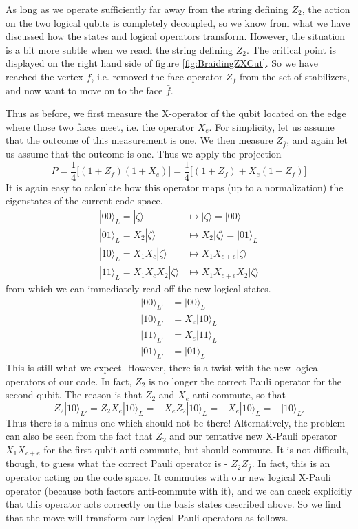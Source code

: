 \documentclass[a4paper, draft]{article}
\theoremstyle{own}
\theoremstyle{remark}
\begin{document}
As long as we operate sufficiently far away from the string defining $Z_2$, the action on the two logical qubits is completely decoupled, so we know from what we have discussed how the states and logical operators transform. However, the situation is a bit more subtle when we reach the string defining $Z_2$. The critical point is displayed on the right hand side of figure \ref{fig:BraidingZXCut}. So we have reached the vertex $f$, i.e. removed the face operator $Z_f$ from the set of stabilizers, and now want to move on to the face $\bar{f}$. 

Thus as before, we first measure the X-operator of the qubit located on the edge where those two faces meet, i.e. the operator $X_e$. For simplicity, let us assume that the outcome of this measurement is one. We then measure $Z_{\bar{f}}$, and again let us assume that the outcome is one. Thus we apply the projection
$$
P = \frac{1}{4} \big[ (1 + Z_f)(1 + X_e) \big] 
= \frac{1}{4} \big[ (1 + Z_f) + X_e(1 - Z_f) \big] 
$$
It is again easy to calculate how this operator maps (up to a normalization) the eigenstates of the current code space.
\begin{align*}
|00 \rangle_L = |\zeta \rangle &\mapsto |\zeta \rangle = |00 \rangle \\
|01 \rangle_L = X_2 |\zeta \rangle &\mapsto X_2 |\zeta \rangle = |01 \rangle_L \\
|10 \rangle_L = X_1 X_c |\zeta \rangle &\mapsto X_1 X_{c+e} |\zeta \rangle  \\
|11 \rangle_L = X_1 X_c X_2 |\zeta \rangle &\mapsto X_1 X_{c+e} X_2 |\zeta \rangle
\end{align*}
from which we can immediately read off the new logical states.
\begin{align*}
|00\rangle_{L'} &= |00 \rangle_L \\
|10\rangle_{L'} &= X_e |10 \rangle_L \\
|11\rangle_{L'} &= X_e |11 \rangle_L \\
|01\rangle_{L'} &= | 01 \rangle_L 
\end{align*}
This is still what we expect. However, there is a twist with the new logical operators of our code. In fact, $Z_2$ is no longer the correct Pauli operator for the second qubit. The reason is that $Z_2$ and $X_e$ anti-commute, so that
$$
Z_2 |10 \rangle_{L'} = Z_2 X_e |10 \rangle_L = - X_e Z_2 |10 \rangle_L = - X_e |10 \rangle_L = - |10 \rangle_{L'}
$$
Thus there is a minus one which should not be there! Alternatively, the problem can also be seen from the fact that $Z_2$ and our tentative new X-Pauli operator $X_1 X_{c+e}$ for the first qubit anti-commute, but should commute. It is not difficult, though, to guess what the correct Pauli operator is - $Z_2 Z_{\bar{f}}$. In fact, this is an operator acting on the code space. It commutes with our new logical X-Pauli operator (because both factors anti-commute with it), and we can check explicitly that this operator acts correctly on the basis states described above. So we find that the move will transform our logical Pauli operators as follows.
\end{document}
